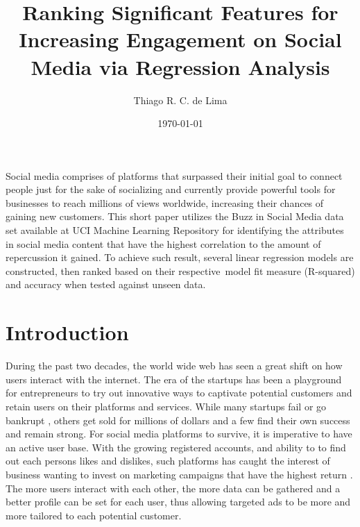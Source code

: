 \documentclass[11pt]{article}
\renewenvironment{abstract}
  {{\bfseries\noindent{\abstractname}\par\nobreak}\footnotesize}
  {\bigskip}
\begin{document}
\title{Ranking Significant Features for Increasing Engagement on Social Media
via Regression Analysis}



\author[1]{Thiago R. C. de Lima}%
%


\vspace{-1em}



  \date{\today}


\begingroup
\let\center\flushleft
\let\endcenter\endflushleft
\maketitle
\endgroup





\begin{abstract}
Social media comprises of platforms that surpassed their initial goal to
connect people just for the sake of socializing and currently provide
powerful tools for businesses to reach millions of views worldwide,
increasing their chances of gaining new customers. This short paper
utilizes the Buzz in Social Media data set available at UCI Machine
Learning Repository for identifying the attributes in social media
content that have the highest correlation to the amount of repercussion
it gained. To achieve such result, several linear regression models are
constructed, then ranked based on their respective~model fit measure
(R-squared) and accuracy when tested against unseen data.%
\end{abstract}%



\sloppy


\section*{Introduction}
\label{intro} 
During the past two decades, the world wide web has seen a great shift on how users interact with the internet. The era of the startups has been a playground for entrepreneurs to try out innovative ways to captivate potential customers and retain users on their platforms and services. While many startups fail or go bankrupt \cite{fail} \cite{genome2019}, others get sold for millions of dollars \cite{million} and a few find their own success and remain strong. For social media platforms to survive, it is imperative to have an active user base. With the growing registered accounts, and ability to to find out each persons likes and dislikes, such platforms has caught the interest of business wanting to invest on marketing campaigns that have the highest return \cite{saravanakumar2012social}. The more users interact with each other, the more data can be gathered and a better profile can be set for each user, thus allowing targeted ads to be more and more tailored to each potential customer.
\end{document}
